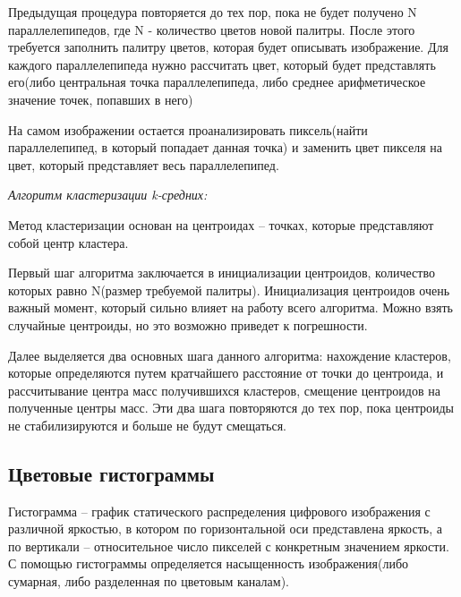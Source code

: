 Предыдущая процедура повторяется до тех пор, пока не будет получено N параллелепипедов, где N - количество цветов новой палитры. После этого требуется заполнить палитру цветов, которая будет описывать изображение. Для каждого параллелепипеда нужно рассчитать цвет, который будет представлять его(либо центральная точка параллелепипеда, либо среднее арифметическое значение точек, попавших в него)

На самом изображении остается проанализировать пиксель(найти параллелепипед, в который попадает данная точка) и заменить цвет пикселя на цвет, который представляет весь параллелепипед.

\textit{Алгоритм кластеризации k-средних:}

Метод кластеризации основан на центроидах -- точках, которые представляют собой центр кластера.

Первый шаг алгоритма заключается в инициализации центроидов, количество которых равно N(размер требуемой палитры). Инициализация центроидов очень важный момент, который сильно влияет на работу всего алгоритма. Можно взять случайные центроиды, но это возможно приведет к погрешности.

Далее выделяется два основных шага данного алгоритма: нахождение кластеров, которые определяются путем кратчайшего расстояние от точки до центроида, и рассчитывание центра масс получившихся кластеров, смещение центроидов на полученные центры масс. Эти два шага повторяются до тех пор, пока центроиды не стабилизируются и больше не будут смещаться.

\begin{figure}[ht!]
\end{figure}

\subsection{ Цветовые гистограммы}
Гистограмма -- график статического распределения цифрового изображения с различной яркостью, в котором по горизонтальной оси представлена яркость, а по вертикали -- относительное число пикселей с конкретным значением яркости. С помощью гистограммы определяется насыщенность изображения(либо сумарная, либо разделенная по цветовым каналам).

